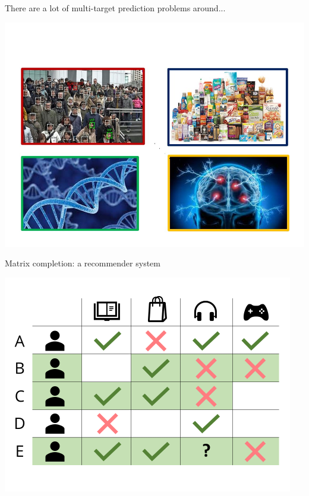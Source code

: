 \documentclass[]{beamer}
\begin{document}
\begin{frame}{There are a lot of multi-target prediction problems around...}

\begin{center}
\includegraphics[width=\textwidth,trim = 0 0 0 70,clip]{Figures/pictures/Slide25}
\end{center}

\end{frame} 

\begin{frame}{Matrix completion: a recommender system}

\begin{center}
\includegraphics[scale=0.5]{Figures/collafilt}
\end{center}

\end{frame}
\end{document}
